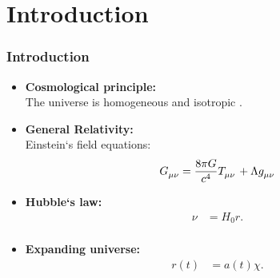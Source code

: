 \documentclass{beamer}
\begin{document}
\section{Introduction}
\begin{frame}
\frametitle{Introduction}
\begin{itemize}
\item \textbf{Cosmological principle:}\\
The universe is homogeneous and isotropic \citep{ITC}.
\item \textbf{General Relativity:}\\
Einstein`s field equations:
\begin{equation}\label{eq:GR}
\begin{split}
\tensor{G}{_{\mu\nu}}&=\frac{8\pi G}{c^{4}}\tensor{T}{_{\mu\nu}}+\Lambda\tensor{g}{_{\mu\nu}}\\
\end{split}
\end{equation}
\item \textbf{Hubble`s law:}
\begin{equation}\label{eq:Hubble}
\begin{split}
\nu&=H_{0}r.\\
\end{split}
\end{equation}
\item \textbf{Expanding universe:}
\begin{equation}\label{eq:scale}
\begin{split}
r(t) &= a(t)\chi.\\
\end{split}
\end{equation}

\end{itemize}
\end{frame}
\end{document}
